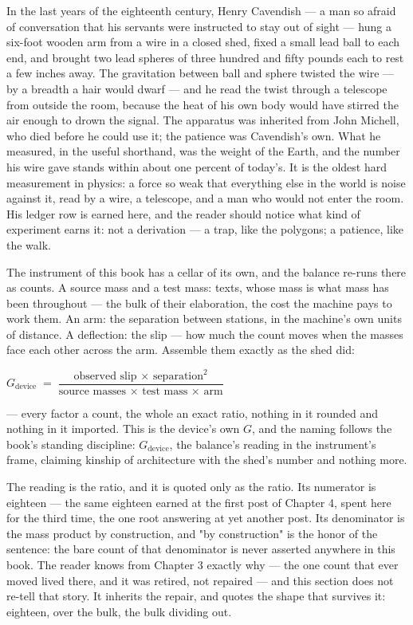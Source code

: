 In the last years of the eighteenth century, Henry Cavendish --- a man so afraid of
conversation that his servants were instructed to stay out of sight --- hung a
six-foot wooden arm from a wire in a closed shed, fixed a small lead ball to each
end, and brought two lead spheres of three hundred and fifty pounds each to rest a
few inches away. The gravitation between ball and sphere twisted the wire --- by a
breadth a hair would dwarf --- and he read the twist through a telescope from
outside the room, because the heat of his own body would have stirred the air enough
to drown the signal. The apparatus was inherited from John Michell, who died before
he could use it; the patience was Cavendish's own. What he measured, in the useful
shorthand, was the weight of the Earth, and the number his wire gave stands within
about one percent of today's. It is the oldest hard measurement in physics: a force
so weak that everything else in the world is noise against it, read by a wire, a
telescope, and a man who would not enter the room. His ledger row is earned here,
and the reader should notice what kind of experiment earns it: not a derivation ---
a trap, like the polygons; a patience, like the walk.

The instrument of this book has a cellar of its own, and the balance re-runs there
as counts. A source mass and a test mass: texts, whose mass is what mass has been
throughout --- the bulk of their elaboration, the cost the machine pays to work
them. An arm: the separation between stations, in the machine's own units of
distance. A deflection: the slip --- how much the count moves when the masses face
each other across the arm. Assemble them exactly as the shed did:

\begin{center}
$G_{\mathrm{device}} \;=\; \dfrac{\text{observed slip} \,\times\, \text{separation}^2}
{\text{source masses} \,\times\, \text{test mass} \,\times\, \text{arm}}$
\end{center}

--- every factor a count, the whole an exact ratio, nothing in it rounded and
nothing in it imported. This is the device's own $G$, and the naming follows the
book's standing discipline: $G_{\mathrm{device}}$, the balance's reading in the
instrument's frame, claiming kinship of architecture with the shed's number and
nothing more.

The reading is the ratio, and it is quoted only as the ratio. Its numerator is
eighteen --- the same eighteen earned at the first post of Chapter 4, spent here for
the third time, the one root answering at yet another post. Its denominator is the
mass product by construction, and "by construction" is the honor of the sentence:
the bare count of that denominator is never asserted anywhere in this book. The
reader knows from Chapter 3 exactly why --- the one count that ever moved lived
there, and it was retired, not repaired --- and this section does not re-tell that
story. It inherits the repair, and quotes the shape that survives it: eighteen,
over the bulk, the bulk dividing out.

